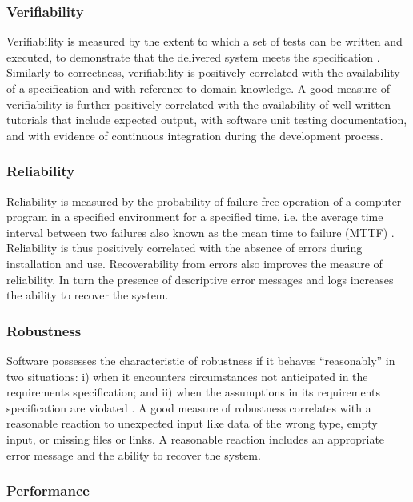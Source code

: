 \documentclass[12pt, notitlepage]{article}
\begin{document}
\subsubsection{Verifiability}

Verifiability is measured by the extent to which a set of tests can be written and executed, to demonstrate that the delivered system meets the specification \citep{sommerville}. Similarly to correctness, verifiability is positively correlated with the availability of a specification and with reference to domain knowledge. A good measure of verifiability is further positively correlated with the availability of well written tutorials that include expected output, with software unit testing documentation, and with evidence of continuous integration during the development process. 

\subsubsection{Reliability}

Reliability is measured by the probability of failure-free operation of a computer program in a specified environment for a specified time, i.e. the average time interval between two failures also known as the mean time to failure (MTTF) \citep{GhezziEtAl2003} \citep{musa1987software}. Reliability is thus positively correlated with the absence of errors during installation and use. Recoverability from errors also improves the measure of reliability. In turn the presence of descriptive error messages and logs increases the ability to recover the system.

\subsubsection{Robustness}

Software possesses the characteristic of robustness if it behaves “reasonably” in two situations: i) when it encounters circumstances not anticipated in the requirements specification; and ii) when the assumptions in its requirements specification are violated \citep{boehm2007software} \citep{ghezzi1991fundamentals}. A good measure of robustness correlates with a reasonable reaction to unexpected input like data of the wrong type, empty input, or missing files or links. A reasonable reaction includes an appropriate error message and the ability to recover the system.

\subsubsection{Performance}
\end{document}
